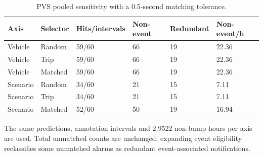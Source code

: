 \begin{table}[p]
\centering
\begin{singlespace}
\small
\caption{PVS pooled sensitivity with a 0.5-second matching tolerance.}\label{tab:s-pvs-half-second}
\begin{tabularx}{\linewidth}{XXYYYY}
\toprule
Axis & Selector & Hits/intervals & Non-event & Redundant & Non-event/h \\
\midrule
Vehicle & Random & 59/60 & 66 & 19 & 22.36 \\
Vehicle & Trip & 59/60 & 66 & 19 & 22.36 \\
Vehicle & Matched & 59/60 & 66 & 19 & 22.36 \\
Scenario & Random & 34/60 & 21 & 15 & 7.11 \\
Scenario & Trip & 34/60 & 21 & 15 & 7.11 \\
Scenario & Matched & 52/60 & 50 & 19 & 16.94 \\
\bottomrule
\end{tabularx}
\par\smallskip
\raggedright The same predictions, annotation intervals and 2.9522 non-bump hours per axis are used. Total unmatched counts are unchanged; expanding event eligibility reclassifies some unmatched alarms as redundant event-associated notifications.
\end{singlespace}
\end{table}
